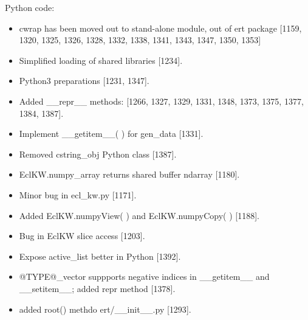 \documentclass[letterpaper,10pt,english]{sphinxmanual}
\begin{document}
Python code:
\begin{itemize}
\item {} 
cwrap has been moved out to stand-alone module, out of ert
package {[}1159, 1320, 1325, 1326, 1328, 1332, 1338, 1341, 1343, 1347, 1350, 1353{]}

\item {} 
Simplified loading of shared libraries {[}1234{]}.

\item {} 
Python3 preparations {[}1231, 1347{]}.

\item {} 
Added \_\_repr\_\_ methods: {[}1266, 1327, 1329, 1331, 1348, 1373, 1375, 1377, 1384, 1387{]}.

\item {} 
Implement \_\_getitem\_\_( ) for gen\_data {[}1331{]}.

\item {} 
Removed cstring\_obj Python class {[}1387{]}.

\item {} 
EclKW.numpy\_array returns shared buffer ndarray {[}1180{]}.

\item {} 
Minor bug in ecl\_kw.py {[}1171{]}.

\item {} 
Added EclKW.numpyView( ) and EclKW.numpyCopy( ) {[}1188{]}.

\item {} 
Bug in EclKW slice access {[}1203{]}.

\item {} 
Expose active\_list better in Python {[}1392{]}.

\item {} 
@TYPE@\_vector suppports negative indices in \_\_getitem\_\_ and
\_\_setitem\_\_; added repr method {[}1378{]}.

\item {} 
added root() methdo ert/\_\_init\_\_.py {[}1293{]}.

\end{itemize}
\end{document}
